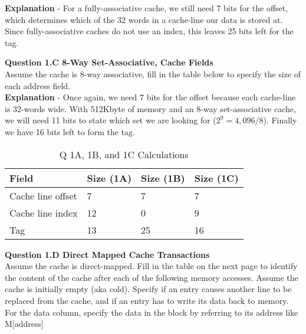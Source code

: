 \documentclass[a4paper,11pt]{article}
\begin{document}
\textbf{Explanation} - For a fully-associative cache, we still need 7 bits for the offset, which determines which of the 32 words in a cache-line our data is stored at. Since fully-associative caches do not use an index, this leaves 25 bits left for the tag. 


\item \textbf{Question 1.C 8-Way Set-Associative, Cache Fields} \\
Assume the cache is 8-way associative, fill in the table below to specify the size of each address field. \\

\textbf{Explanation} - Once again, we need 7 bits for the offset because each cache-line is 32-words wide. With 512Kbyte of memory and an 8-way set-associative cache, we will need 11 bits to state which set we are looking for ($2^{9} =4,096/8$). Finally we have 16 bits left to form the tag.

\begin{table}[H]
\caption{Q 1A, 1B, and 1C Calculations} \label{tab:q1calc} 
\begin{center}
\begin{tabular}{| l | l | l | l |} \hline 
   Field              &  Size (1A) & Size (1B) & Size (1C)     \\ \hline
   Cache line offset  &  7         &   7       &   7           \\ \hline
   Cache line index   &  12        &   0       &   9           \\ \hline
   Tag                &  13        &   25      &   16          \\ \hline
\end{tabular}
\end{center}
\end{table}



\item \textbf{Question 1.D Direct Mapped Cache Transactions } \\

Assume the cache is direct-mapped. Fill in the table on the next page to identify the content of the cache after each of the following memory accesses. Assume the cache is initially empty (aka cold). Specify if an entry causes another line to be replaced from the cache, and if an entry has to write its data back to memory. For the data column, specify the data in the block by referring to its address like M[address]
\end{document}
